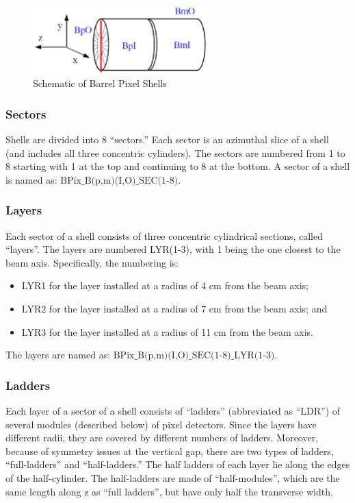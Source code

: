 \documentclass{cmspaper}
\begin{document}
\begin{figure}[hbtp] 
  \begin{center} 
        \includegraphics[width =0.6\textwidth]{barrel_z_seg.eps} 
    \caption{Schematic of Barrel Pixel Shells} 
    \label{figure:bpix_shells} 
  \end{center} 
\end{figure} 

\subsubsection{Sectors}

Shells are divided into 8 ``sectors.'' Each sector is an azimuthal slice
of a shell (and includes all three concentric cylinders). The sectors are 
numbered from 1 to 8 starting with 1 at the top
and continuing to 8 at the bottom.
A sector of a shell is named as:
$\mbox{BPix\_B(p,m)(I,O)\_SEC(1-8).}$


\subsubsection{Layers}

Each sector of a shell consists of three concentric cylindrical sections,
called ``layers''. 
The layers are numbered LYR(1-3), 
with 1 being the one closest to the beam axis. 
Specifically, the numbering is:
\begin{itemize}
\item LYR1 for the layer installed at a radius of 4 cm from the beam axis;
\item LYR2 for the layer installed at a radius of 7 cm from the beam axis; and
\item LYR3 for the layer installed at a radius of 11 cm from the beam axis.
\end{itemize}
The layers are named as:
$\mbox{BPix\_B(p,m)(I,O)\_SEC(1-8)\_LYR(1-3).}$


\subsubsection{Ladders}

Each layer of a sector of a shell consists of ``ladders'' (abbreviated as ``LDR'') of several modules
(described below) of pixel detectors. Since the layers have different
radii, they are covered by different numbers of ladders. Moreover,
because of symmetry issues at the vertical gap, there are two types of 
ladders, ``full-ladders'' and ``half-ladders.'' The half ladders of each
layer lie along the edges of the half-cylinder. The half-ladders are made of 
``half-modules'', which are the same length along z as ``full ladders'', 
but have only half the transverse width.
\end{document}
